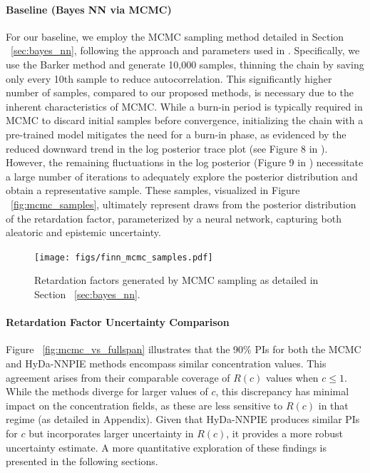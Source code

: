 \paragraph{Baseline (Bayes NN via MCMC)}
For our baseline, we employ the MCMC sampling method detailed in Section ~\vref{sec:bayes_nn}, following the approach and parameters used in \cite{finn}. Specifically, we use the Barker method and generate 10,000 samples, thinning the chain by saving only every 10th sample to reduce autocorrelation. This significantly higher number of samples, compared to our proposed methods, is necessary due to the inherent characteristics of MCMC. While a burn-in period is typically required in MCMC to discard initial samples before convergence, initializing the chain with a pre-trained model mitigates the need for a burn-in phase, as evidenced by the reduced downward trend in the log posterior trace plot (see Figure 8 in \cite{finn}). However, the remaining fluctuations in the log posterior (Figure 9 in \cite{finn}) necessitate a large number of iterations to adequately explore the posterior distribution and obtain a representative sample. These samples, visualized in Figure ~\vref{fig:mcmc_samples}, ultimately represent draws from the posterior distribution of the retardation factor, parameterized by a neural network, capturing both aleatoric and epistemic uncertainty.


\begin{figure}[h!]
    \centering
    \texttt{[image: figs/finn\_mcmc\_samples.pdf]}
    \caption{Retardation factors generated by MCMC sampling as detailed in Section ~\vref{sec:bayes_nn}.}
    \label{fig:mcmc_samples}
\end{figure}


\paragraph{Retardation Factor Uncertainty Comparison}
Figure ~\vref{fig:mcmc_vs_fullspan} illustrates that the 90\% PIs for both the MCMC and HyDa-NNPIE methods encompass similar concentration values. This agreement arises from their comparable coverage of $R(c)$ values when $c \leq 1$. While the methods diverge for larger values of $c$, this discrepancy has minimal impact on the concentration fields, as these are less sensitive to $R(c)$ in that regime (as detailed in Appendix).
Given that HyDa-NNPIE produces similar PIs for $c$ but incorporates larger uncertainty in $R(c)$, it provides a more robust uncertainty estimate. A more quantitative exploration of these findings is presented in the following sections. %

